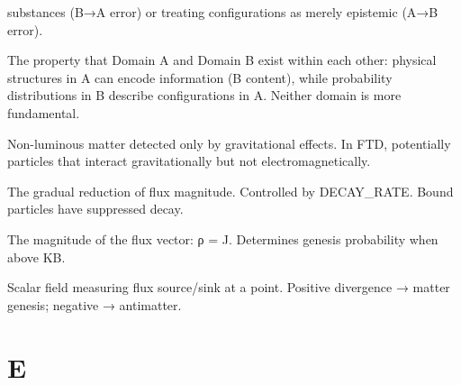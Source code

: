 \documentclass[
  11pt,
  letterpaper,
  twoside,
  openright]{book}
\begin{document}
\begin{description}
substances (B→A error) or treating configurations as merely epistemic
(A→B error).
\item[\textbf{Domain Interpenetration}]
The property that Domain A and Domain B exist within each other:
physical structures in A can encode information (B content), while
probability distributions in B describe configurations in A. Neither
domain is more fundamental.
\item[\textbf{Dark Matter}]
Non-luminous matter detected only by gravitational effects. In FTD,
potentially particles that interact gravitationally but not
electromagnetically.
\item[\textbf{Decay}]
The gradual reduction of flux magnitude. Controlled by DECAY\_RATE.
Bound particles have suppressed decay.
\item[\textbf{Density}]
The magnitude of the flux vector: ρ = \textbar J\textbar. Determines
genesis probability when above KB.
\item[\textbf{Divergence}]
Scalar field measuring flux source/sink at a point. Positive divergence
→ matter genesis; negative → antimatter.
\end{description}

\section{E}\label{e}
\end{document}
